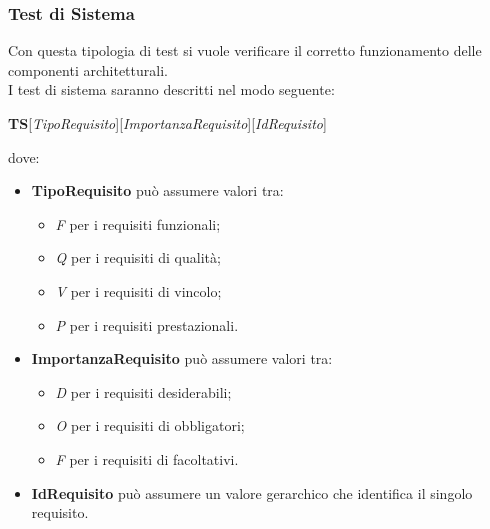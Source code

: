 \subsubsection{Test di Sistema}
Con questa tipologia di test si vuole verificare il corretto funzionamento delle componenti architetturali.\\
I test di sistema saranno descritti nel modo seguente:
\begin{center}
\textbf{TS}[\textit{TipoRequisito}][\textit{ImportanzaRequisito}][\textit{IdRequisito}]
\end{center}
dove:
\begin{itemize}
\item \textbf{TipoRequisito} può assumere valori tra:
\begin{itemize}
\item \textit{F} per i requisiti funzionali;
\item \textit{Q} per i requisiti di qualità;
\item \textit{V} per i requisiti di vincolo;
\item \textit{P} per i requisiti prestazionali.
\end{itemize}
\item \textbf{ImportanzaRequisito} può assumere valori tra:
\begin{itemize}
\item \textit{D} per i requisiti desiderabili;
\item \textit{O} per i requisiti di obbligatori;
\item \textit{F} per i requisiti di facoltativi.
\end{itemize}
\item \textbf{IdRequisito} può assumere un valore gerarchico che identifica il singolo requisito.
\end{itemize}
